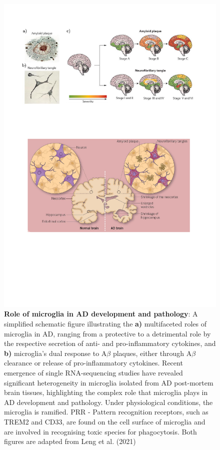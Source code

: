 \begin{figure}[!htp]
	\centering
	\includegraphics[page=8,trim={0 9cm 0cm 0cm},clip, scale = 0.8]{Figures/Introduction_Figures.pdf}
	\captionsetup{width=0.95\textwidth,singlelinecheck=off}
	\caption[Role of microglia in AD development and pathology]%
	{\textbf{Role of microglia in AD development and pathology}: A simplified schematic figure illustrating the \textbf{a)} multifaceted roles of microglia in AD, ranging from a protective to a detrimental role by the respective secretion of anti- and pro-inflammatory cytokines, and \textbf{b)} microglia's dual response to A$\beta$ plaques, either through A$\beta$ clearance or release of pro-inflammatory cytokines. Recent emergence of single RNA-sequencing studies have revealed significant heterogeneity in microglia isolated from AD post-mortem brain tissues, highlighting the complex role that microglia plays in AD development and pathology. Under physiological conditions, the microglia is ramified. PRR - Pattern recognition receptors, such as TREM2 and CD33, are found on the cell surface of microglia and are involved in recognising toxic species for phagocytosis. Both figures are adapted from Leng et al. (2021)\cite{Leng2021a}  
	}
	\label{fig:microglia_AD}
\end{figure}


